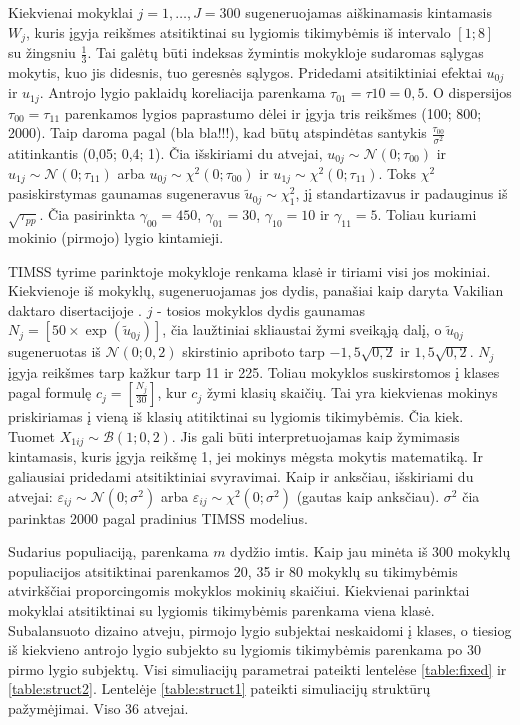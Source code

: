 \documentclass[11pt,a4paper]{article}
\begin{document}
\indent Kiekvienai mokyklai $j =1,\dots,J=300$ sugeneruojamas aiškinamasis kintamasis $W_j$, kuris įgyja reikšmes atsitiktinai su lygiomis tikimybėmis iš intervalo $[1; 8]$ su žingsniu $\frac{1}{3}$. Tai galėtų būti indeksas žymintis mokykloje sudaromas sąlygas mokytis, kuo jis didesnis, tuo geresnės sąlygos. Pridedami atsitiktiniai efektai $u_{0j}$ ir $u_{1j}$. Antrojo lygio paklaidų koreliacija parenkama $\tau_{01} = \tau{10}=0,5$. O dispersijos $\tau_{00}=\tau_{11}$ parenkamos lygios paprastumo dėlei ir įgyja tris reikšmes (100; 800; 2000). Taip daroma pagal (bla bla!!!), kad būtų atspindėtas santykis $\frac{\tau_{00}}{\sigma^2}$ atitinkantis (0,05; 0,4; 1). Čia išskiriami du atvejai, $u_{0j}\sim \mathcal{N}(0; \tau_{00})$ ir $u_{1j}\sim \mathcal{N}(0; \tau_{11})$ arba $u_{0j}\sim \chi^2(0; \tau_{00})$ ir $u_{1j}\sim \chi^2(0; \tau_{11})$. Toks $\chi^2$ pasiskirstymas gaunamas sugeneravus $\tilde{u}_{0j}\sim\chi^2_1$, jį standartizavus ir padauginus iš $\sqrt{\tau_{pp}}$. Čia pasirinkta  $\gamma_{00}=450$, $\gamma_{01}=30$, $\gamma_{10}=10$ ir $\gamma_{11}=5$. Toliau kuriami mokinio (pirmojo) lygio kintamieji.

\indent TIMSS tyrime parinktoje mokykloje renkama klasė ir tiriami visi jos mokiniai. Kiekvienoje iš mokyklų, sugeneruojamas jos dydis, panašiai kaip daryta Vakilian daktaro disertacijoje \cite{mcmc}. $j$ - tosios mokyklos dydis gaunamas $N_j=\left[50\times\exp{(\tilde{u}_{0j})}\right]$, čia laužtiniai skliaustai žymi sveikąją dalį, o $\tilde{u}_{0j}$ sugeneruotas iš $\mathcal{N}(0; 0,2)$ skirstinio apriboto tarp $-1,5 \sqrt{0,2}$ ir $1,5 \sqrt{0,2}$.  $N_j$ įgyja reikšmes tarp kažkur tarp 11 ir 225. Toliau mokyklos suskirstomos į klases pagal formulę $c_j=\left[\frac{N_j}{30}\right]$, kur $c_j$ žymi klasių skaičių. Tai yra kiekvienas mokinys priskiriamas į vieną iš klasių atitiktinai su lygiomis tikimybėmis. Čia kiek. Tuomet $X_{1ij}\sim \mathcal{B}(1; 0,2)$. Jis gali būti interpretuojamas kaip žymimasis kintamasis, kuris įgyja reikšmę 1, jei mokinys mėgsta mokytis matematiką. Ir galiausiai pridedami atsitiktiniai svyravimai. Kaip ir anksčiau, išskiriami du atvejai: $\varepsilon_{ij}\sim \mathcal{N}(0; \sigma^2)$ arba $\varepsilon_{ij}\sim \chi^2(0; \sigma^2)$ (gautas kaip anksčiau). $\sigma^2$ čia parinktas 2000 pagal pradinius TIMSS modelius.

\indent Sudarius populiaciją, parenkama $m$ dydžio imtis. Kaip jau minėta iš 300 mokyklų populiacijos atsitiktinai parenkamos 20, 35 ir 80 mokyklų su tikimybėmis atvirkščiai proporcingomis mokyklos mokinių skaičiui. Kiekvienai parinktai mokyklai atsitiktinai su lygiomis tikimybėmis parenkama viena klasė. Subalansuoto dizaino atveju, pirmojo lygio subjektai neskaidomi į klases, o tiesiog iš kiekvieno antrojo lygio subjekto su lygiomis tikimybėmis parenkama po 30 pirmo lygio subjektų. Visi simuliacijų parametrai pateikti lentelėse \ref{table:fixed} ir \ref{table:struct2}. Lentelėje \ref{table:struct1} pateikti simuliacijų struktūrų pažymėjimai. Viso 36 atvejai.
\end{document}
